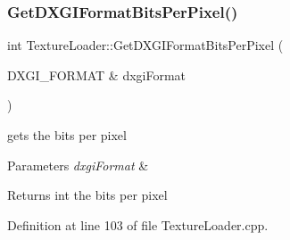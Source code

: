\subsubsection{\texorpdfstring{Get\+D\+X\+G\+I\+Format\+Bits\+Per\+Pixel()}{GetDXGIFormatBitsPerPixel()}}
{\footnotesize\ttfamily int Texture\+Loader\+::\+Get\+D\+X\+G\+I\+Format\+Bits\+Per\+Pixel (\begin{DoxyParamCaption}\item[{D\+X\+G\+I\+\_\+\+F\+O\+R\+M\+AT \&}]{dxgi\+Format }\end{DoxyParamCaption})\hspace{0.3cm}{\ttfamily [private]}}



gets the bits per pixel 


\begin{DoxyParams}{Parameters}
{\em dxgi\+Format} & \\
\hline
\end{DoxyParams}
\begin{DoxyReturn}{Returns}
int the bits per pixel 
\end{DoxyReturn}


Definition at line 103 of file Texture\+Loader.\+cpp.


